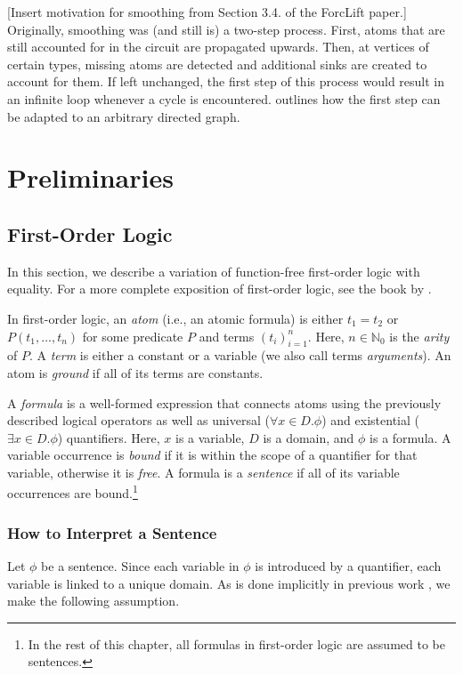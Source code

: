 [Insert motivation for smoothing from Section 3.4. of the ForcLift paper.] Originally, smoothing was (and still is) a two-step process. First, atoms that are still accounted for in the circuit are propagated upwards. Then, at vertices of certain types, missing atoms are detected and additional sinks are created to account for them. If left unchanged, the first step of this process would result in an infinite loop whenever a cycle is encountered.  outlines how the first step can be adapted to an arbitrary directed graph.

\section{Preliminaries}

\subsection{First-Order Logic}

In this section, we describe a variation of function-free first-order logic with equality. For a more complete exposition of first-order logic, see the book by \citet{DBLP:books/daglib/0023546}.

In first-order logic, an \emph{atom} (i.e., an atomic formula) is either $t_1 = t_2$ or $P(t_1, \dots, t_n)$ for some predicate $P$ and terms $(t_i)_{i=1}^n$. Here, $n \in \mathbb{N}_0$ is the \emph{arity} of $P$. A \emph{term} is either a constant or a variable (we also call terms \emph{arguments}). An atom is \emph{ground} if all of its terms are constants.

A \emph{formula} is a well-formed expression that connects atoms using the previously described logical operators as well as universal ($\forall x \in D. \phi$) and existential ($\exists x \in D. \phi$) quantifiers. Here, $x$ is a variable, $D$ is a domain, and $\phi$ is a formula. A variable occurrence is \emph{bound} if it is within the scope of a quantifier for that variable, otherwise it is \emph{free}. A formula is a \emph{sentence} if all of its variable occurrences are bound.\footnote{In the rest of this chapter, all formulas in first-order logic are assumed to be sentences.}

\subsubsection{How to Interpret a Sentence}

Let $\phi$ be a sentence. Since each variable in $\phi$ is introduced by a quantifier, each variable is linked to a unique domain. As is done implicitly in previous work \citep{DBLP:phd/basesearch/VandenBroeck13}, we make the following assumption.


